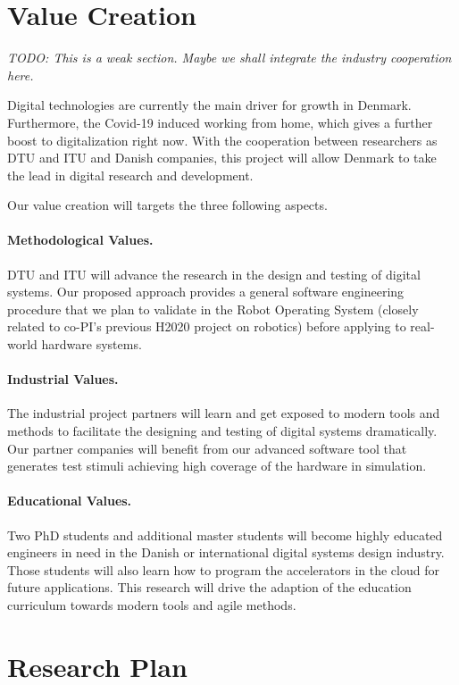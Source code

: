 \documentclass[fleqn,12pt]{article}
\newcommand{\todo}[1]{{\it TODO: #1}}
\begin{document}
\section{Value Creation}

\todo{This is a weak section. Maybe we shall integrate the industry cooperation here.}

Digital technologies are currently the main driver for growth in
Denmark. Furthermore, the Covid-19 induced working from home, which gives a
further boost to digitalization right now.  With the
cooperation between researchers as DTU and ITU and Danish companies, this project
will allow Denmark to take the lead in digital research and
development.

Our value creation will targets the three following aspects.


\paragraph{Methodological Values. }
DTU and ITU will advance the research in the design and testing of
digital systems.  Our proposed approach provides a general software
engineering procedure that we plan to validate in the Robot Operating
System (closely related to co-PI's previous H2020 project on robotics) before
applying to real-world hardware systems.


\paragraph{Industrial Values.}
The industrial project partners will learn and get exposed to modern tools and methods to facilitate the designing and testing of digital systems dramatically. Our partner companies will benefit from our advanced software tool that generates test stimuli achieving high coverage of the hardware in simulation.

\paragraph{Educational Values.}
Two PhD students and additional master students will become highly educated engineers in need in the Danish or international digital systems design industry. Those students will also learn how to program the accelerators in the cloud for future applications. This research will drive the adaption of the education curriculum towards modern tools and agile methods.


\section{Research Plan}
\end{document}
